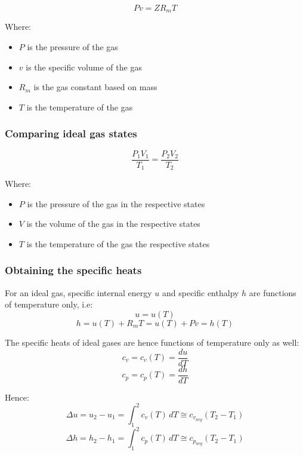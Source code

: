 \documentclass[11pt]{article}
\begin{document}
\[Pv = ZR_mT\]

Where:
\begin{itemize}
\item \(P\) is the pressure of the gas
\item \(v\) is the specific volume of the gas
\item \(R_m\) is the gas constant based on mass
\item \(T\) is the temperature of the gas
\end{itemize}

\subsubsection{Comparing ideal gas states}
\label{sec:org090f1e4}
\[\frac{P_1 V_1}{T_1} = \frac{P_2 V_2}{T_2}\]

Where:
\begin{itemize}
\item \(P\) is the pressure of the gas in the respective states
\item \(V\) is the volume of the gas in the respective states
\item \(T\) is the temperature of the gas the respective states
\end{itemize}

\subsubsection{Obtaining the specific heats}
\label{sec:orgbb6d293}
For an ideal gas, specific internal energy \(u\) and specific enthalpy \(h\) are functions of temperature only, i.e:
\[u = u(T)\]
\[h = u(T) + R_mT = u(T) + Pv = h(T)\]

The specific heats of ideal gases are hence functions of temperature only as well:
\[c_v = c_v(T) = \frac{du}{dT}\]
\[c_p = c_p(T) = \frac{dh}{dT}\]

Hence:
\[\Delta u = u_2 - u_1 = \int_1^2 c_v(T) \, dT \cong c_{v_{avg}} \left(T_2 - T_1 \right)\]
\[\Delta h = h_2 - h_1 = \int_1^2 c_p(T) \, dT \cong c_{p_{avg}} \left(T_2 - T_1 \right)\]
\end{document}

